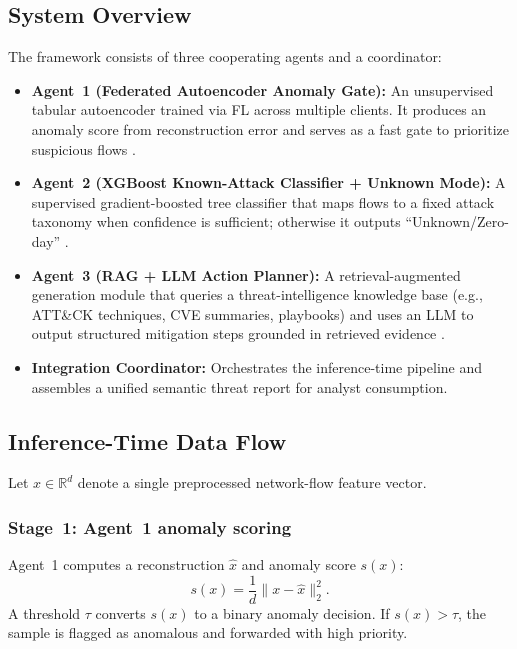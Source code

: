 \documentclass[conference]{IEEEtran}
\begin{document}
\subsection{System Overview}
The framework consists of three cooperating agents and a coordinator:

\begin{itemize}
  \item \textbf{Agent~1 (Federated Autoencoder Anomaly Gate):} An unsupervised tabular autoencoder trained via FL across multiple clients. It produces an anomaly score from reconstruction error and serves as a fast gate to prioritize suspicious flows \cite{sakurada2014ae,chalapathy2019anomaly}.
  \item \textbf{Agent~2 (XGBoost Known-Attack Classifier + Unknown Mode):} A supervised gradient-boosted tree classifier that maps flows to a fixed attack taxonomy when confidence is sufficient; otherwise it outputs ``Unknown/Zero-day'' \cite{xgboost2016,scheirer2013openset,bendale2016openset}.
  \item \textbf{Agent~3 (RAG + LLM Action Planner):} A retrieval-augmented generation module that queries a threat-intelligence knowledge base (e.g., ATT\&CK techniques, CVE summaries, playbooks) and uses an LLM to output structured mitigation steps grounded in retrieved evidence \cite{lewis2020rag,attck,cve,nist80061}.
  \item \textbf{Integration Coordinator:} Orchestrates the inference-time pipeline and assembles a unified semantic threat report for analyst consumption.
\end{itemize}

\subsection{Inference-Time Data Flow}
Let $x \in \mathbb{R}^d$ denote a single preprocessed network-flow feature vector.

\subsubsection{Stage~1: Agent~1 anomaly scoring}
Agent~1 computes a reconstruction $\hat{x}$ and anomaly score $s(x)$:
\begin{equation}
  s(x) = \frac{1}{d}\lVert x - \hat{x} \rVert_2^2.
  \label{eq:recon_error}
\end{equation}
A threshold $\tau$ converts $s(x)$ to a binary anomaly decision. If $s(x) > \tau$, the sample is flagged as anomalous and forwarded with high priority.
\end{document}
